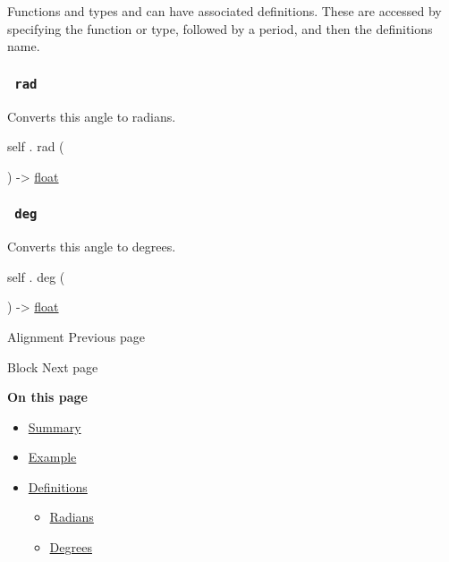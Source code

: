 \label{definitions-tooltip}
Functions and types and can have associated definitions. These are
accessed by specifying the function or type, followed by a period, and
then the definition\textquotesingle s name.

\subsubsection{\texorpdfstring{\texttt{\ rad\ }}{ rad }}\label{definitions-rad}

Converts this angle to radians.

self { . } { rad } (

) -\textgreater{} \href{/docs/reference/foundations/float/}{float}

\subsubsection{\texorpdfstring{\texttt{\ deg\ }}{ deg }}\label{definitions-deg}

Converts this angle to degrees.

self { . } { deg } (

) -\textgreater{} \href{/docs/reference/foundations/float/}{float}

\href{/docs/reference/layout/alignment/}{\pandocbounded{}}

{ Alignment } { Previous page }

\href{/docs/reference/layout/block/}{\pandocbounded{}}

{ Block } { Next page }

\textbf{On this page}

\begin{itemize}
\tightlist
\item
  \hyperref[summary]{Summary}
\item
  \hyperref[example]{Example}
\item
  \hyperref[definitions]{Definitions}

  \begin{itemize}
  \tightlist
  \item
    \hyperref[definitions-rad]{Radians}
  \item
    \hyperref[definitions-deg]{Degrees}
  \end{itemize}
\end{itemize}


